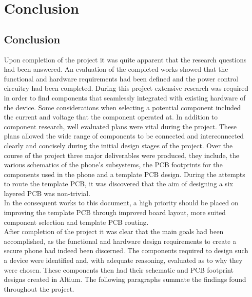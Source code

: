 
\chapter{Conclusion} %

\label{Chapter8} %

\section{Conclusion}

	Upon completion of the project it was quite apparent that the research questions had been answered. 
An evaluation of the completed works showed that the functional and hardware requirements had been defined and the power control circuitry had been completed. During this project extensive research was required in order to find components that seamlessly integrated with existing hardware of the device. 
Some considerations when selecting a potential component included the current and voltage that the component operated at. 
In addition to component research, well evaluated plans were vital during the project. 
These plans allowed the wide range of components to be connected and interconnected clearly and concisely during the initial design stages of the project. 
Over the course of the project three major deliverables were produced, they include, the various schematics of the phone's subsystems, the PCB footprints for the components used in the phone and a template PCB design. 
During the attempts to route the template PCB, it was discovered that the aim of designing a six layered PCB was non-trivial.\\
	In the consequent works to this document, a high priority should be placed on improving the template PCB through improved board layout, more suited component selection and template PCB routing. \\

	After completion of the project it was clear that the main goals had been accomplished, as the functional and hardware design requirements to create a secure phone had indeed been discerned. 
The components required to design such a device were identified and, with adequate reasoning, evaluated as to why they were chosen. 
These components then had their schematic and PCB footprint designs created in Altium. 
The following paragraphs summate the findings found throughout the project.\\





